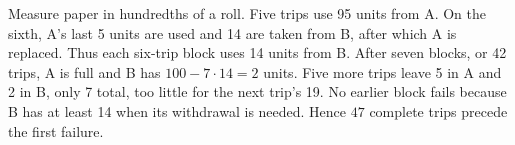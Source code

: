 Measure paper in hundredths of a roll. Five trips use 95 units from A. On the sixth, A's last 5 units are used and 14 are taken from B, after which A is replaced. Thus each six-trip block uses 14 units from B. After seven blocks, or 42 trips, A is full and B has $ 100-7\cdot14=2 $ units. Five more trips leave 5 in A and 2 in B, only 7 total, too little for the next trip's 19. No earlier block fails because B has at least 14 when its withdrawal is needed. Hence $\boxed{47}$ complete trips precede the first failure.
